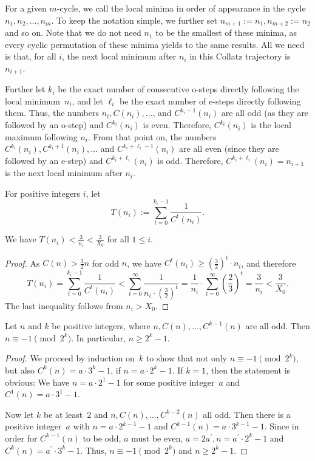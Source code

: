 \documentclass[12pt,reqno]{article}
\begin{document}
\begin{definition}\label{Definition_k_i}
For a given $m$-cycle, we call the local minima in order of appearance in the cycle $n_1, n_2, \ldots, n_m$. To keep the notation simple, we further set $n_{m+1}:=n_1, n_{m+2}:=n_2$ and so on. Note that we do not need $n_1$ to be the smallest of these minima, as every cyclic permutation of these minima yields to the same results. All we need is that, for all $i$, the next local minimum after $n_i$ in this Collatz trajectory is $n_{i+1}$. 

Further let $k_i$ be the exact number of consecutive o-steps directly following the local minimum~$n_i$, and let  $\ell_i$  be the exact number of e-steps directly following them. Thus, the numbers $n_i, C(n_i), \ldots$, and $C^{k_i-1}(n_i)$ are all odd (as they are followed by an o-step) and $C^{k_i}(n_i)$ is even. Therefore, $C^{k_i}(n_i)$ is the local maximum following $n_i$. From that point on, the numbers $C^{k_i}(n_i), C^{k_i+1}(n_i), \ldots$ and $C^{k_i+\ell_i-1}(n_i)$ are all even (since they are followed by an e-step) and $C^{k_i+\ell_i}(n_i)$ is odd. Therefore, $C^{k_i+\ell_i}(n_i)=n_{i+1}$ is the next local minimum after $n_i$.

For positive integers $i$, let 
\[T(n_i):=\sum_{t=0}^{k_i-1} \frac{1}{C^t(n_i)}.\] 
\end{definition}

\begin{remark}\label{Remark_T-trvialBound}
We have $T(n_i)<\frac{3}{n_i}<\tfrac{3}{X_0}$ for all $1\leq i$.
\end{remark}

\begin{proof}
As $C(n)>\tfrac{3}{2} n$ for odd $n$, we have $C^t(n_i)\geq \left(\tfrac{3}{2}\right)^t \cdot n_i$, and therefore
\[
T(n_i)=\sum_{t=0}^{k_i-1} \frac{1}{C^t(n_i)} < \sum_{t=0}^{\infty} \frac{1}{n_i \cdot \left(\tfrac{3}{2}\right)^t} = \frac{1}{n_i} \cdot \sum_{t=0}^{\infty} \left(\frac{2}{3}\right)^t = \frac{3}{n_i} < \frac{3}{X_0}.
\] 
The last inequality follows from $n_i>X_0$.
\end{proof}


\begin{lemma}\label{Lemma12}
Let $n$ and $k$ be positive integers, where $n, C(n), \ldots, C^{k-1}(n)$ are all odd. Then $n\equiv -1 \pmod{2^k}$. In particular, $n\geq 2^k-1$.
\end{lemma}

\begin{proof}
We proceed by induction on~$k$ to show that not only $n\equiv -1 \pmod{2^k}$, but also $C^k(n)=a \cdot 3^k-1$, if $n=a\cdot 2^k-1$. If $k=1$, then the statement is obvious: We have $n=a\cdot 2^1 -1$ for some positive integer~$a$ and $C^1(n)=a\cdot 3^1 - 1$. 

Now let $k$ be at least~2 and $n, C(n), \ldots, C^{k-2}(n)$ all odd. Then there is a positive integer~$a$ with $n=a\cdot 2^{k-1} -1$ and $C^{k-1}(n)=a\cdot 3^{k-1} -1$. Since in order for $C^{k-1}(n)$ to be odd, $a$ must be even, $a=2a^{\prime}, n=a^{\prime} \cdot 2^k-1$ and $C^k(n)=a^{\prime} \cdot 3^k-1$. Thus, $n\equiv -1\pmod{2^k}$ and $n\geq 2^k-1$.
\end{proof}
\end{document}
